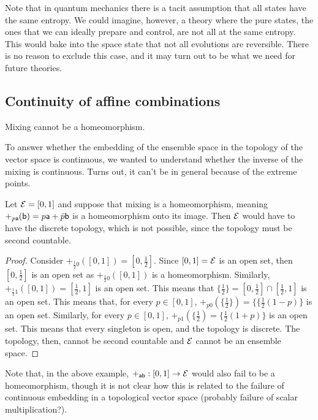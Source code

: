 Note that in quantum mechanics there is a tacit assumption that all states have the same entropy. We could imagine, however, a theory where the pure states, the ones that we can ideally prepare and control, are not all at the same entropy. This would bake into the space state that not all evolutions are reversible. There is no reason to exclude this case, and it may turn out to be what we need for future theories.

\subsection{Continuity of affine combinations}

\begin{insight}
	Mixing cannot be a homeomorphism.
\end{insight}

To answer whether the embedding of the ensemble space in the topology of the vector space is continuous, we wanted to understand whether the inverse of the mixing is continuous. Turns out, it can't be in general because of the extreme points.

\begin{prop}
	Let $\Ens = [0,1]$ and suppose that mixing is a homeomorphism, meaning $+_{p \ens[a]}(\ens[b]) = p\ens[a] + \bar{p}\ens[b]$ is a homeomorphism onto its image. Then $\Ens$ would have to have the discrete topology, which is not possible, since the topology must be second countable.
\end{prop}

\begin{proof}
	Consider $+_{\frac{1}{2}0}([0,1])= [0,\frac{1}{2}]$. Since $[0,1] = \Ens$ is an open set, then $[0,\frac{1}{2}]$ is an open set as $+_{\frac{1}{2}0}([0,1])$ is a homeomorphism. Similarly, $+_{\frac{1}{2}1}([0,1])= [\frac{1}{2},1]$ is an open set. This means that $\{\frac{1}{2}\} = [0,\frac{1}{2}] \cap [\frac{1}{2},1]$ is an open set. This means that, for every $p \in [0,1]$, $+_{p0}(\{\frac{1}{2}\})= \{\{\frac{1}{2}(1-p)\}$ is an open set. Similarly, for every $p \in [0,1]$, $+_{p1}(\{\frac{1}{2})= \{\frac{1}{2}(1+p)\}$ is an open set. This means that every singleton is open, and the topology is discrete. The topology, then, cannot be second countable and $\Ens$ cannot be an ensemble space.
\end{proof}

Note that, in the above example, $+_{\ens[a]\ens[b]} : [0,1] \to \Ens$ would also fail to be a homeomorphism, though it is not clear how this is related to the failure of continuous embedding in a topological vector space (probably failure of scalar multiplication?).

